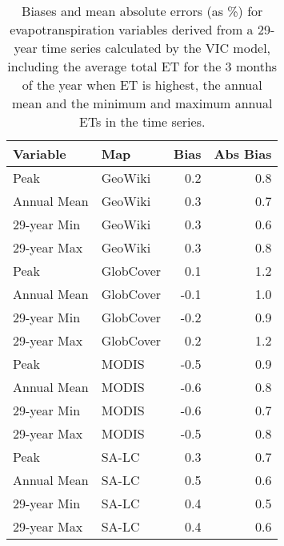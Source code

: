 \begin{longtable}{llrr}
\caption{Biases and mean absolute errors (as \%) for evapotranspiration variables derived from a 29-year time series calculated by the VIC model, including the average total ET for the 3 months of the year when ET is highest, the annual mean and the minimum and maximum annual ETs in the time series.} \\ 
  \hline
Variable & Map & Bias & Abs Bias \\ 
  \hline
Peak & GeoWiki & 0.2 & 0.8 \\ 
  Annual Mean & GeoWiki & 0.3 & 0.7 \\ 
  29-year Min & GeoWiki & 0.3 & 0.6 \\ 
  29-year Max & GeoWiki & 0.3 & 0.8 \\ 
  Peak & GlobCover & 0.1 & 1.2 \\ 
  Annual Mean & GlobCover & -0.1 & 1.0 \\ 
  29-year Min & GlobCover & -0.2 & 0.9 \\ 
  29-year Max & GlobCover & 0.2 & 1.2 \\ 
  Peak & MODIS & -0.5 & 0.9 \\ 
  Annual Mean & MODIS & -0.6 & 0.8 \\ 
  29-year Min & MODIS & -0.6 & 0.7 \\ 
  29-year Max & MODIS & -0.5 & 0.8 \\ 
  Peak & SA-LC & 0.3 & 0.7 \\ 
  Annual Mean & SA-LC & 0.5 & 0.6 \\ 
  29-year Min & SA-LC & 0.4 & 0.5 \\ 
  29-year Max & SA-LC & 0.4 & 0.6 \\ 
   \hline
\hline
\end{longtable}
